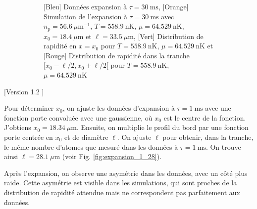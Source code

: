 \documentclass[a3, 10pt,twoside]{article}          %
\theoremstyle{plain}
\theoremstyle{definition}
\theoremstyle{remark}
\theoremstyle{definition} %
\begin{document}
\begin{figure}[H]
\begin{subfigure}[b]{0.45\textwidth}
        \caption{{\color{blue}[Bleu] Données expansion à $\tau = 30~\text{ms}$}, {\color{orange}[Orange] Simulation de l'expansion à $\tau = 30~\text{ms}$ avec $n_p = 56.6~\mu \text{m}^{-1}$, $T = 558.9~\text{nK}$, $\mu = 64.529~\text{nK}$, $x_0 = 18.4~\mu \text{m}$ et $\ell = 33.5~\mu \text{m}$}, {\color{OliveGreen}[Vert] Distribution de rapidité en $x = x_0$ pour $T = 558.9~\text{nK}$, $\mu = 64.529~\text{nK}$} et {\color{red}[Rouge] Distribution de rapidité dans la tranche $[x_0 - \ell/2, x_0 + \ell/2[$ pour $T = 558.9~\text{nK}$, $\mu = 64.529~\text{nK}$}}
        \label{fig:expansion_30_33}
    \end{subfigure}
    \caption{}
    \label{}
\end{figure}

[Version 1.2 ] 

	Pour déterminer $x_0$, on ajuste les données d'expansion à $\tau = 1~\text{ms}$ avec une fonction porte convoluée avec une gaussienne, où $x_0$ est le centre de la fonction. J'obtiens $x_0 = 18.34~\mu \text{m}$. Ensuite, on multiplie le profil du bord par une fonction porte centrée en $x_0$ et de diamètre $\ell$. On ajuste $\ell$ pour obtenir, dans la tranche, le même nombre d'atomes que mesuré dans les données à $\tau = 1~\text{ms}$. On trouve ainsi $\ell = 28.1~\mu \text{m}$ (voir Fig. \ref{fig:expansion_1_28}). 

Après l'expansion, on observe une asymétrie dans les données, avec un côté plus raide. Cette asymétrie est visible dans les simulations, qui sont proches de la distribution de rapidité attendue mais ne correspondent pas parfaitement aux données.
\end{document}

